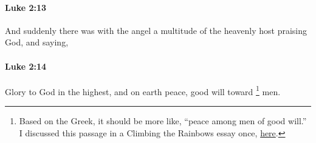 		\paragraph{Luke 2:13} %
			\label{LUKE-2-13}

			And suddenly there was with the angel a multitude of the heavenly host praising God, and saying,

			\begin{framed}
			\scriptsize
				\begin{compactdesc}
					\item[SBLG] 
				\end{compactdesc}
			\end{framed}

		\paragraph{Luke 2:14} %
			\label{LUKE-2-14}

			Glory to God in the highest, and on earth peace, good will toward%
				\footnote{%
					Based on the Greek, it should be more like, ``peace among men of good will.'' I discussed this passage in a Climbing the Rainbows essay once, \href{https://climbingtherainbows.substack.com/p/december-interregnum-part-2-the-ancient}{here}.
					}
			men.

